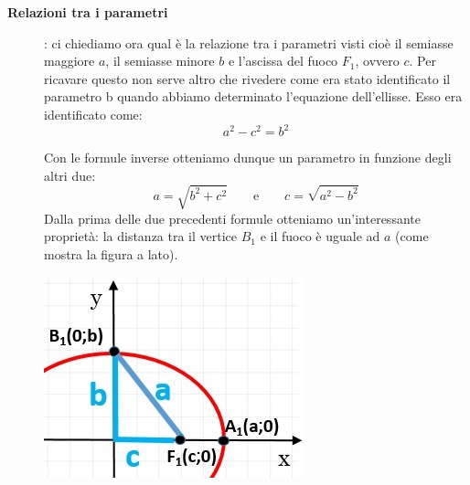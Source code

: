 \begin{description}
\item [\textbf{Relazioni tra i parametri}]: ci chiediamo ora qual è la relazione 
tra i parametri visti cioè il semiasse maggiore $a$, il semiasse minore $b$ e 
l'ascissa del fuoco $ F_{1} $, ovvero $c$. Per ricavare questo non serve altro che 
rivedere come era stato identificato il parametro b quando abbiamo 
determinato l'equazione dell'ellisse. Esso era identificato come: 
\begin{equation} \label{relaz1param} a^{2} - c^{2} = b^{2}\end{equation}

\begin{minipage}{.7\textwidth}
  Con le formule inverse otteniamo dunque un parametro in funzione 
degli altri due:
\[a=\sqrt{b^{2}+c^{2}} \qquad \text{e} \qquad c=\sqrt{a^{2}-b^{2}}\]
  Dalla prima delle due precedenti formule otteniamo un'interessante 
proprietà: la distanza tra il vertice $B_1$ e il fuoco è uguale ad $a$ (come mostra la figura a lato).
\end{minipage}
\hspace{.2cm}
\begin{minipage}{.25\textwidth}
  \includegraphics[width=\textwidth]{img/abc.jpg}
\end{minipage}


\end{description}
